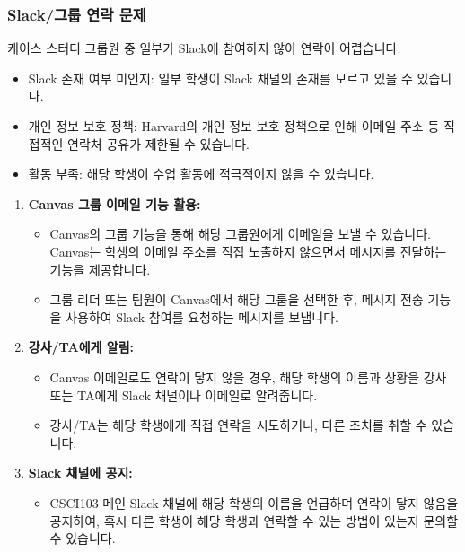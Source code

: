 \documentclass[11pt,a4paper]{article}
\begin{document}
\subsubsection*{Slack/그룹 연락 문제}
\begin{tcolorbox}[warningbox={증상}]
케이스 스터디 그룹원 중 일부가 Slack에 참여하지 않아 연락이 어렵습니다.
\end{tcolorbox}

\begin{tcolorbox}[summarybox={원인 가설}]
\begin{itemize}
    \item Slack 존재 여부 미인지: 일부 학생이 Slack 채널의 존재를 모르고 있을 수 있습니다.
    \item 개인 정보 보호 정책: Harvard의 개인 정보 보호 정책으로 인해 이메일 주소 등 직접적인 연락처 공유가 제한될 수 있습니다.
    \item 활동 부족: 해당 학생이 수업 활동에 적극적이지 않을 수 있습니다.
\end{itemize}
\end{tcolorbox}

\begin{tcolorbox}[examplebox={수정 방법}]
\begin{enumerate}
    \item \textbf{Canvas 그룹 이메일 기능 활용:}
    \begin{itemize}
        \item Canvas의 그룹 기능을 통해 해당 그룹원에게 이메일을 보낼 수 있습니다. Canvas는 학생의 이메일 주소를 직접 노출하지 않으면서 메시지를 전달하는 기능을 제공합니다.
        \item 그룹 리더 또는 팀원이 Canvas에서 해당 그룹을 선택한 후, 메시지 전송 기능을 사용하여 Slack 참여를 요청하는 메시지를 보냅니다.
    \end{itemize}
    \item \textbf{강사/TA에게 알림:}
    \begin{itemize}
        \item Canvas 이메일로도 연락이 닿지 않을 경우, 해당 학생의 이름과 상황을 강사 또는 TA에게 Slack 채널이나 이메일로 알려줍니다.
        \item 강사/TA는 해당 학생에게 직접 연락을 시도하거나, 다른 조치를 취할 수 있습니다.
    \end{itemize}
    \item \textbf{Slack 채널에 공지:}
    \begin{itemize}
        \item CSCI103 메인 Slack 채널에 해당 학생의 이름을 언급하며 연락이 닿지 않음을 공지하여, 혹시 다른 학생이 해당 학생과 연락할 수 있는 방법이 있는지 문의할 수 있습니다.
    \end{itemize}
\end{enumerate}
\end{tcolorbox}
\end{document}
